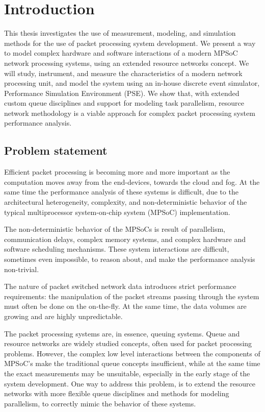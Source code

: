 \chapter{Introduction}
\label{chapter:intro}
This thesis investigates the use of measurement, modeling, and simulation methods for the use of packet processing system development. We present a way to model complex hardware and software interactions of a modern MPSoC network processing systems, using an extended resource networks concept. We will study, instrument, and measure the characteristics of a modern network processing unit, and model the system using an in-house discrete event simulator, Performance Simulation Environment (PSE). We show that, with extended custom queue disciplines and support for modeling task parallelism, resource network methodology is a viable approach for complex packet processing system performance analysis.



\section{Problem statement}
Efficient packet processing is becoming more and more important as the computation moves away from the end-devices, towards the cloud and fog. At the same time the performance analysis of these systems is difficult, due to the architectural heterogeneity, complexity, and non-deterministic behavior of the typical multiprocessor system-on-chip system (MPSoC) implementation.

The non-deterministic behavior of the MPSoCs is result of parallelism, communication delays, complex memory systems, and complex hardware and software scheduling mechanisms. These system interactions are difficult, sometimes even impossible, to reason about, and make the performance analysis non-trivial.

The nature of packet switched network data introduces strict performance requirements: the manipulation of the packet streams passing through the system must often be done on the on-the-fly. At the same time, the data volumes are growing and are highly unpredictable.

The packet processing systems are, in essence, queuing systems. Queue and resource networks are widely studied concepts, often used for packet processing problems. However, the complex low level interactions between the components of MPSoC's make the traditional queue concepts insufficient, while at the same time the exact measurements may be unsuitable, especially in the early stage of the system development. One way to address this problem, is to extend the resource networks with more flexible queue disciplines and methods for modeling parallelism, to correctly mimic the behavior of these systems.

